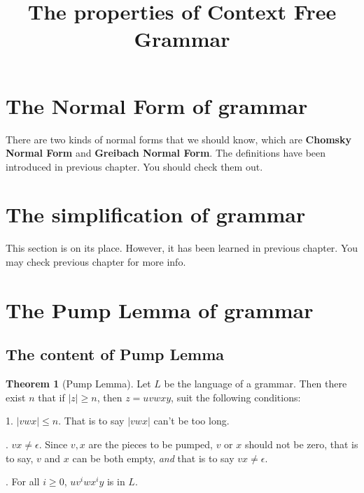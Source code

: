 \documentclass[12pt]{article}
\theoremstyle{definition}
\newtheorem{thm}[definition]{Theorem}
\theoremstyle{remark}
\begin{document}
\title{The properties of Context Free Grammar}
\maketitle
\tableofcontents 
\newpage

\section{The Normal Form of grammar}
\label{sec:The Normal Form of grammar}

There are two kinds of normal forms that we should know, which are \textbf{Chomsky Normal Form} and \textbf{Greibach Normal Form}. 
The definitions have been introduced in previous chapter. You should check them out.

\section{The simplification of grammar}
\label{sec:The simplification of grammar}

This section is on its place. However, it has been learned in previous chapter. You may 
check previous chapter for more info.
\section{The Pump Lemma of grammar}
\label{sec:The Pump Lemma of grammar}

\subsection{The content of Pump Lemma}
\begin{thm}[Pump Lemma]
\label{Pump Lemma}
Let \(L \) be the language of a grammar. Then there exist \(n\) that if \(|z| \ge n\), then \(z = uvwxy\), suit the following 
conditions: 

	\bigskip
	\setlength{\hangindent}{33pt}
	1. \(| v w x | \le n\). That is to say \( |v  w x |  \) can't be too long.

	. \(v x \ne\epsilon\). Since \(v,  x \) are the pieces to be pumped, \(v\) or \(x\) should not be zero, that is to 
	say, \(v\) and \(x\) can be both empty, \emph{and} that is to say \( v x \ne\epsilon\).

	. For all \(i \ge 0\), \(u v ^{i} w x ^{i} y\) is in \(L\).
\end{thm}
\end{document}
